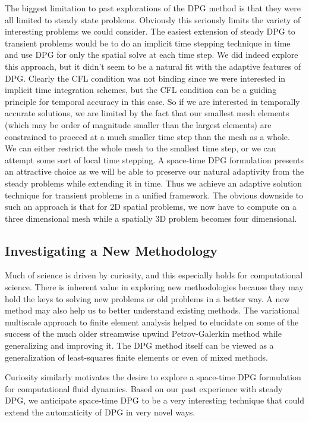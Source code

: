 \documentclass[Proposal.tex]{subfiles}
\begin{document}
The biggest limitation to past explorations of the DPG method is that they were all limited to steady state problems.
Obviously this seriously limits the variety of interesting problems we could consider. 
The easiest extension of steady DPG to transient problems would be to do an implicit time stepping technique in time and use DPG for only the spatial solve at each time step.
We did indeed explore this approach, but it didn't seem to be a natural fit with the adaptive features of DPG.
Clearly the CFL condition was not binding since we were interested in implicit time integration schemes, but the CFL condition can be a guiding principle for temporal accuracy in this case.
So if we are interested in temporally accurate solutions, we are limited by the fact that our smallest mesh elements (which may be order of magnitude smaller than the largest elements) are constrained to proceed at a much smaller time step than the mesh as a whole. 
We can either restrict the whole mesh to the smallest time step, or we can attempt some sort of local time stepping.
A space-time DPG formulation presents an attractive choice as we will be able to preserve our natural adaptivity from the steady problems while extending it in time.
Thus we achieve an adaptive solution technique for transient problems in a unified framework.
The obvious downside to such an approach is that for 2D spatial problems, we now have to compute on a three dimensional mesh while a spatially 3D problem becomes four dimensional.

\subsection{Investigating a New Methodology}
Much of science is driven by curiosity, and this especially holds for computational science. 
There is inherent value in exploring new methodologies because they may hold the keys to solving new problems or old problems in a better way.
A new method may also help us to better understand existing methods. 
The variational multiscale approach to finite element analysis helped to elucidate on some of the success of the much older streamwise upwind Petrov-Galerkin method while generalizing and improving it.
The DPG method itself can be viewed as a generalization of least-squares finite elements or even of mixed methods. 

Curiosity similarly motivates the desire to explore a space-time DPG formulation for computational fluid dynamics. 
Based on our past experience with steady DPG, we anticipate space-time DPG to be a very interesting technique that could extend the automaticity of DPG in very novel ways.
\end{document}
